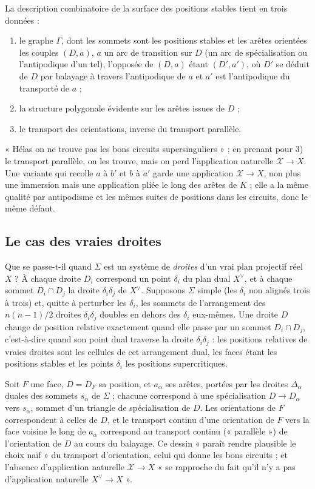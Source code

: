 \documentclass[11pt,a4paper]{article}
\begin{document}
La description combinatoire de la surface des positions stables tient en trois
données :
\begin{enumerate}
\item le graphe $\Gamma$, dont les sommets sont les positions stables et les
arêtes orientées les couples $(D, a)$, $a$ un arc de transition sur $D$ (un
arc de spécialisation ou l'antipodique d'un tel), l'opposée de $(D, a)$ étant
$(D', a')$, où $D'$ se déduit de $D$ par balayage à travers l'antipodique de
$a$ et $a'$ est l'antipodique du transporté de $a$ ;
\item la structure polygonale évidente sur les arêtes issues de $D$ ;
\item le transport des orientations, inverse du transport parallèle.
\end{enumerate}
« Hélas on ne trouve pas les bons circuits supersinguliers » ; en prenant pour
3) le transport parallèle, on les trouve, mais on perd l'application naturelle
$\mathcal{X} \to X$. Une variante qui recolle $a$ à $b'$ et $b$ à $a'$ garde une
application $\mathcal{X} \to X$, non plus une immersion mais une application
pliée le long des arêtes de $K$ ; elle a la même qualité par antipodisme et les
mêmes suites de positions dans les circuits, donc le même défaut.

\subsection*{Le cas des vraies droites}

Que se passe-t-il quand $\Sigma$ est un système de \emph{droites} d'un vrai plan
projectif réel $X$ ? À chaque droite $D_i$ correspond un point $\delta_i$ du
plan dual $X^{\vee}$, et à chaque sommet $D_i \cap D_j$ la droite
$\delta_i\delta_j$ de $X^{\vee}$. Supposons $\Sigma$ simple (les $\delta_i$ non
alignés trois à trois) et, quitte à perturber les $\delta_i$, les sommets de
l'arrangement des $n(n-1)/2$ droites $\delta_i\delta_j$ doubles en dehors des
$\delta_i$ eux-mêmes. Une droite $D$ change de position relative exactement quand
elle passe par un sommet $D_i \cap D_j$, c'est-à-dire quand son point dual
traverse la droite $\delta_i\delta_j$ : les positions relatives de vraies
droites sont les cellules de cet arrangement dual, les faces étant les
positions stables et les points $\delta_i$ les positions supercritiques.

Soit $F$ une face, $D = D_F$ sa position, et $a_\alpha$ ses arêtes, portées par
les droites $\Delta_\alpha$ duales des sommets $s_\alpha$ de $\Sigma$ ; chacune
correspond à une spécialisation $D \to D_\alpha$ vers $s_\alpha$, sommet d'un
triangle de spécialisation de $D$. Les orientations de $F$ correspondent à
celles de $D$, et le transport continu d'une orientation de $F$ vers la face
voisine le long de $a_\alpha$ correspond au transport continu (« parallèle »)
de l'orientation de $D$ au cours du balayage. Ce dessin « paraît rendre
plausible le choix naïf » du transport d'orientation, celui qui donne les bons
circuits ; et l'absence d'application naturelle $\mathcal{X} \to X$ « se
rapproche du fait qu'il n'y a pas d'application naturelle $X^{\vee} \to X$ ».
\end{document}
